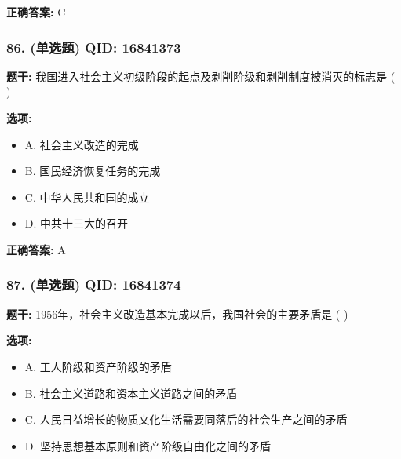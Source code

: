 \documentclass[12pt,UTF8]{ctexart}
\begin{document}
\textbf{正确答案:}
C

\vspace{0.3em}\hrulefill\vspace{0.7em}

\subsubsection*{86. (单选题) \small QID: 16841373}

\textbf{题干:}
我国进入社会主义初级阶段的起点及剥削阶级和剥削制度被消灭的标志是 ( )

\textbf{选项:}
\begin{itemize}[leftmargin=*]

  \item A. 社会主义改造的完成

  \item B. 国民经济恢复任务的完成

  \item C. 中华人民共和国的成立

  \item D. 中共十三大的召开

\end{itemize}

\textbf{正确答案:}
A

\vspace{0.3em}\hrulefill\vspace{0.7em}

\subsubsection*{87. (单选题) \small QID: 16841374}

\textbf{题干:}
1956年，社会主义改造基本完成以后，我国社会的主要矛盾是 ( )

\textbf{选项:}
\begin{itemize}[leftmargin=*]

  \item A. 工人阶级和资产阶级的矛盾

  \item B. 社会主义道路和资本主义道路之间的矛盾

  \item C. 人民日益增长的物质文化生活需要同落后的社会生产之间的矛盾

  \item D. 坚持思想基本原则和资产阶级自由化之间的矛盾

\end{itemize}
\end{document}
